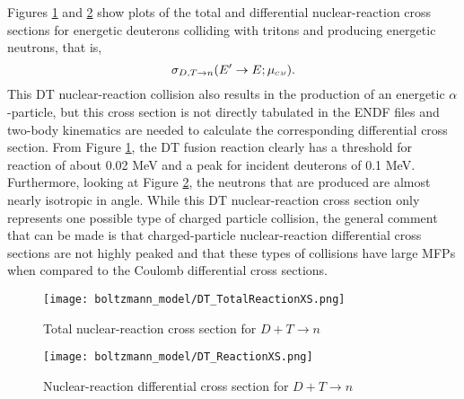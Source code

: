 \documentclass[../main.tex]{subfiles}
\begin{document}
Figures \ref{fig:sig_rt} and \ref{fig:sig_r} show plots of the total and differential nuclear-reaction cross sections for energetic deuterons colliding with tritons and producing energetic neutrons, that is, 
\begin{equation}
    \sigma_{D,T \rightarrow n}(E^{\prime} \rightarrow E; \mucm).
\end{equation}
This DT nuclear-reaction collision also results in the production of an energetic $\alpha$-particle, but this cross section is not directly tabulated in the ENDF files and two-body kinematics are needed to calculate the corresponding differential cross section. From Figure \ref{fig:sig_rt}, the DT fusion reaction clearly has a threshold for reaction of about 0.02 MeV and a peak for incident deuterons of 0.1 MeV. Furthermore, looking at Figure \ref{fig:sig_r}, the neutrons that are produced are almost nearly isotropic in angle. While this DT nuclear-reaction cross section only represents one possible type of charged particle collision, the general comment that can be made is that charged-particle nuclear-reaction differential cross sections are not highly peaked and that these types of collisions have large MFPs when compared to the Coulomb differential cross sections.

\begin{figure}[!htb]
    \centering
    \texttt{[image: boltzmann\_model/DT\_TotalReactionXS.png]}
    \caption{Total nuclear-reaction cross section for $D+T \rightarrow n$}
    \label{fig:sig_rt}
\end{figure}

\begin{figure}[!htb]
    \centering
    \texttt{[image: boltzmann\_model/DT\_ReactionXS.png]}
    \caption{Nuclear-reaction differential cross section for $D+T \rightarrow n$}
    \label{fig:sig_r}
\end{figure}

\end{document}
